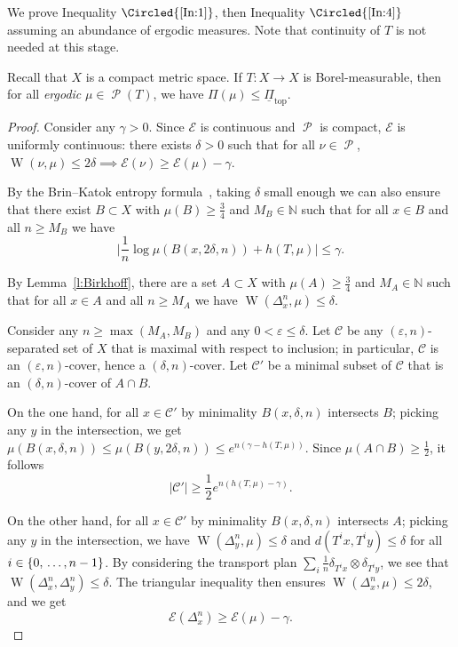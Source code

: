 \documentclass[10pt]{amsart}
\theoremstyle{definition}\newtheorem{defi}[theo]{Definition}\newtheorem{rema}[theo]{Remark}\newtheorem{exam}[theo]{Example}\newtheorem{exem}[theo]{Example}\newtheorem{nota}[theo]{Notation}
\theoremstyle{plain}
\theoremstyle{plain}
\newcommand\eps{\varepsilon}
\newcommand\NLP{\Pi}
\renewcommand\top{{\mathrm{top}}}
\newcommand{\wass}{\operatorname{W}}
\newcommand\Prob{{\operatorname{\mathscr{P}}}}
\newcounter{In}
\newcommand{\Inref}[1]{\Circled{\ref{#1}}}
\newcommand*\8{\infty}
\newcommand\NN{\mathbb{N}}
\newcommand{\En}{\mathcal{E}}
\newcommand{\cC}{\mathcal C}
\begin{document}
We prove Inequality $\Inref{In:1}$, then Inequality $\Inref{In:4}$ {assuming an abundance of ergodic measures.} Note that continuity of $T$ is not needed at this stage.

\begin{prop}[Inequality \Inref{In:1}]\label{prop:upper-ergodic}
Recall that $X$ is a compact metric space. If $T:X\to X$ is Borel-measurable, then for all \emph{ergodic} $\mu\in\Prob(T)$, we have $\NLP(\mu)\le \underline{\Pi}_\top$.
\end{prop}

\begin{proof}
Consider any $\gamma>0$. Since $\En$ is continuous and $\Prob$ is compact, $\En$ is uniformly continuous: there exists $\delta>0$ such that for all $\nu\in\Prob$, $\wass(\nu,\mu)\le 2\delta \implies \En(\nu)\ge \En(\mu)-\gamma$.

By the Brin--Katok entropy formula~\cite{Brin-Katok}, taking $\delta$ small enough we can also ensure that there exist $B\subset X$ with $\mu(B)\ge \frac34$ and $M_B\in\NN$ such that for all $x\in B$ and all $n\ge M_B$ we have
\[
\Big\lvert \frac1n \log \mu(B(x,2\delta,n)) + h(T,\mu) \Big\rvert \le \gamma.
\]

By Lemma~\ref{l:Birkhoff}, there are a set $A\subset X$ with $\mu(A)\ge\frac34$ and $M_A\in\NN$ such that for all $x\in A$ and all $n\ge M_A$ we have $\wass(\Delta_x^n,\mu)\le \delta$.



Consider any $n\ge\max(M_A,M_B)$ and any $0<\varepsilon\le\delta$. Let $\cC$ be any $(\varepsilon,n)$-separated set of $X$ that is maximal with respect to inclusion; in particular, $\cC$ is an $(\eps,n)$-cover, hence a $(\delta,n)$-cover. Let $\cC'$ be a minimal subset of $\cC$ that is an $(\delta,n)$-cover of $A\cap B$.

On the one hand, for all $x\in \cC'$ by minimality $B(x,\delta,n)$ intersects $B$; picking any $y$ in the intersection, we get $\mu(B(x,\delta,n)) \le \mu(B(y,2\delta,n)) \le e^{n(\gamma-h(T,\mu))}$. Since $\mu(A\cap B)\ge \frac12$, it follows
\[
\lvert \cC'\rvert \ge \frac12 e^{n(h(T,\mu)-\gamma)}.
\]

On the other hand, for all $x\in \cC'$ by minimality $B(x,\delta,n)$ intersects $A$; picking any $y$ in the intersection, we have $\wass(\Delta_y^n,\mu)\le \delta$ and $d(T^i x,T^iy)\le \delta$ for all $i\in \{0,\,\dots,\linebreak n-1\}$. By considering the transport plan $\sum_i \frac1n \delta_{T^i x} \otimes \delta_{T^i y}$, we see that $\wass(\Delta_x^n,\Delta_y^n)\le \delta$. The triangular inequality then ensures $\wass(\Delta_x^n,\mu)\le 2\delta$, and we get
\[
\En(\Delta_x^n)\ge \En(\mu)-\gamma.
\]


\end{proof}
\end{document}
